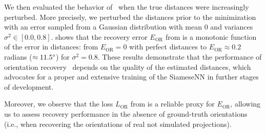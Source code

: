 We then evaluated the behavior of~ when the true distances were increasingly perturbed.
More precisely, we perturbed the distances prior to the minimization with an error sampled from a Gaussian distribution with mean $0$ and variances $\sigma^2 \in [0.0, 0.8]$.
 shows that the recovery error $E_\text{OR}$ from  is a monotonic function of the error in distances: from $E_\text{OR} = 0$ with perfect distances to $E_\text{OR} \approx 0.2$ radians ($\approx 11.5\degree$) for $\sigma^2 = 0.8$.
These results demonstrate that the performance of orientation recovery~ depends on the quality of the estimated distances, which advocates for a proper and extensive training of the SiameseNN in further stages of development.

Moreover, we observe that the loss $L_\text{OR}$ from  is a reliable proxy for $E_\text{OR}$, allowing us to assess recovery performance in the absence of ground-truth orientations (i.e., when recovering the orientations of real not simulated projections).

